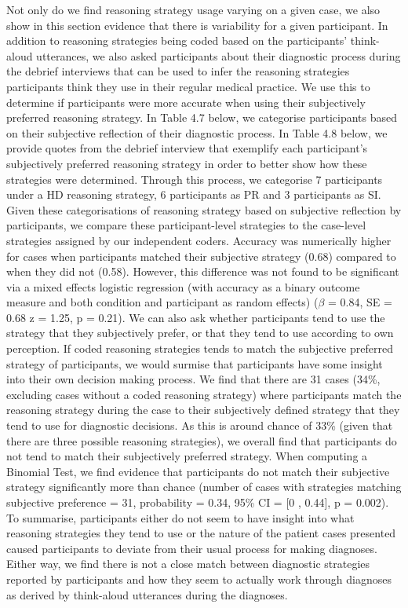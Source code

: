\documentclass[a4paper, nobind]{templates/ociamthesis}
\begin{document}
Not only do we find reasoning strategy usage varying on a given case, we also show in this section evidence that there is variability for a given participant. In addition to reasoning strategies being coded based on the participants' think-aloud utterances, we also asked participants about their diagnostic process during the debrief interviews that can be used to infer the reasoning strategies participants think they use in their regular medical practice. We use this to determine if participants were more accurate when using their subjectively preferred reasoning strategy. In Table 4.7 below, we categorise participants based on their subjective reflection of their diagnostic process. In Table 4.8 below, we provide quotes from the debrief interview that exemplify each participant's subjectively preferred reasoning strategy in order to better show how these strategies were determined. Through this process, we categorise 7 participants under a HD reasoning strategy, 6 participants as PR and 3 participants as SI. Given these categorisations of reasoning strategy based on subjective reflection by participants, we compare these participant-level strategies to the case-level strategies assigned by our independent coders. Accuracy was numerically higher for cases when participants matched their subjective strategy (0.68) compared to when they did not (0.58). However, this difference was not found to be significant via a mixed effects logistic regression (with accuracy as a binary outcome measure and both condition and participant as random effects) (\(\beta\) = 0.84, SE = 0.68 z = 1.25, p = 0.21). We can also ask whether participants tend to use the strategy that they subjectively prefer, or that they tend to use according to own perception. If coded reasoning strategies tends to match the subjective preferred strategy of participants, we would surmise that participants have some insight into their own decision making process. We find that there are 31 cases (34\%, excluding cases without a coded reasoning strategy) where participants match the reasoning strategy during the case to their subjectively defined strategy that they tend to use for diagnostic decisions. As this is around chance of 33\% (given that there are three possible reasoning strategies), we overall find that participants do not tend to match their subjectively preferred strategy. When computing a Binomial Test, we find evidence that participants do not match their subjective strategy significantly more than chance (number of cases with strategies matching subjective preference = 31, probability = 0.34, 95\% CI = {[}0 , 0.44{]}, p = 0.002). To summarise, participants either do not seem to have insight into what reasoning strategies they tend to use or the nature of the patient cases presented caused participants to deviate from their usual process for making diagnoses. Either way, we find there is not a close match between diagnostic strategies reported by participants and how they seem to actually work through diagnoses as derived by think-aloud utterances during the diagnoses.\\
\end{document}
